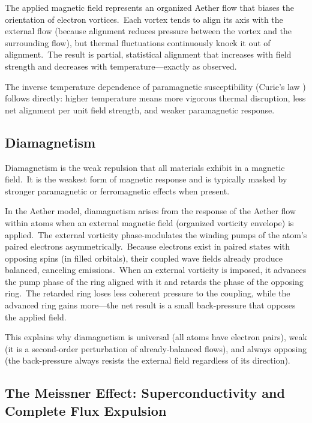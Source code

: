 ﻿\documentclass[12pt,letterpaper]{article}
\begin{document}
The applied magnetic field represents an organized Aether flow that biases the orientation
of electron vortices.\ Each vortex tends to align its axis with the external flow (because
alignment reduces pressure between the vortex and the surrounding flow), but thermal
fluctuations continuously knock it out of alignment.\ The result is partial, statistical
alignment that increases with field strength and decreases with temperature---exactly as
observed.

The inverse temperature dependence of paramagnetic susceptibility (Curie's law \cite{curie1895}) follows
directly: higher temperature means more vigorous thermal disruption, less net alignment
per unit field strength, and weaker paramagnetic response.


\subsection{Diamagnetism}

Diamagnetism is the weak repulsion that all materials exhibit in a magnetic field.\ It is
the weakest form of magnetic response and is typically masked by stronger paramagnetic or
ferromagnetic effects when present.

In the Aether model, diamagnetism arises from the response of the Aether flow within
atoms when an external magnetic field (organized vorticity envelope) is applied.\ The
external vorticity phase-modulates the winding pumps of the atom's paired electrons
asymmetrically.\ Because electrons exist in paired states with opposing spins (in filled
orbitals), their coupled wave fields already produce balanced, canceling emissions.\
When an external vorticity is imposed, it advances the pump phase of the
ring aligned with it and retards the phase of the opposing ring.\ The retarded ring
loses less coherent pressure to the coupling, while the advanced ring gains more---the
net result is a small back-pressure that opposes the applied field.

This explains why diamagnetism is universal (all atoms have electron pairs), weak (it is
a second-order perturbation of already-balanced flows), and always opposing (the back-pressure always resists the external field regardless of its direction).


\subsection{The Meissner Effect: Superconductivity and Complete Flux Expulsion}
\end{document}

